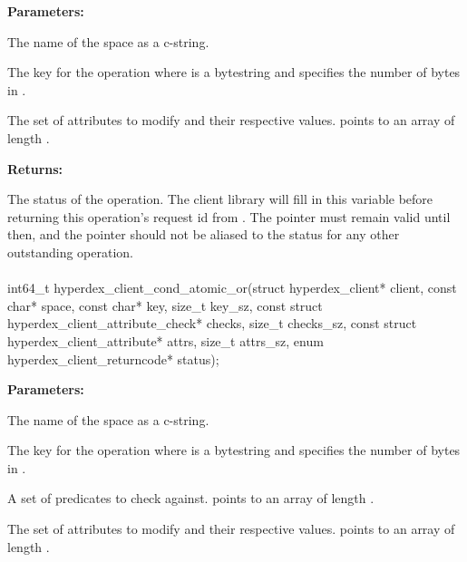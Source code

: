 \noindent\textbf{Parameters:}
\begin{description}[labelindent=\widthof{{\code{attrs}, \code{attrs\_sz}}},leftmargin=*,noitemsep,nolistsep,align=right]
\item[\code{space}] The name of the space as a c-string.
\item[\code{key}, \code{key\_sz}] The key for the operation where  is a bytestring and  specifies the number of bytes in .
\item[\code{attrs}, \code{attrs\_sz}] The set of attributes to modify and their respective values.   points to an array of length .
\end{description}

\noindent\textbf{Returns:}
\begin{description}[labelindent=\widthof{{\code{status}}},leftmargin=*,noitemsep,nolistsep,align=right]
\item[\code{status}] The status of the operation.  The client library will fill in this variable before returning this operation's request id from .  The pointer must remain valid until then, and the pointer should not be aliased to the status for any other outstanding operation.
\end{description}

\paragraph{}
\label{api:c:cond_atomic_or}
\begin{ccode}
int64_t hyperdex_client_cond_atomic_or(struct hyperdex_client* client,
        const char* space,
        const char* key, size_t key_sz,
        const struct hyperdex_client_attribute_check* checks, size_t checks_sz,
        const struct hyperdex_client_attribute* attrs, size_t attrs_sz,
        enum hyperdex_client_returncode* status);
\end{ccode}
\funcdesc 

\noindent\textbf{Parameters:}
\begin{description}[labelindent=\widthof{{\code{checks}, \code{checks\_sz}}},leftmargin=*,noitemsep,nolistsep,align=right]
\item[\code{space}] The name of the space as a c-string.
\item[\code{key}, \code{key\_sz}] The key for the operation where  is a bytestring and  specifies the number of bytes in .
\item[\code{checks}, \code{checks\_sz}] A set of predicates to check against.   points to an array of length .
\item[\code{attrs}, \code{attrs\_sz}] The set of attributes to modify and their respective values.   points to an array of length .
\end{description}

